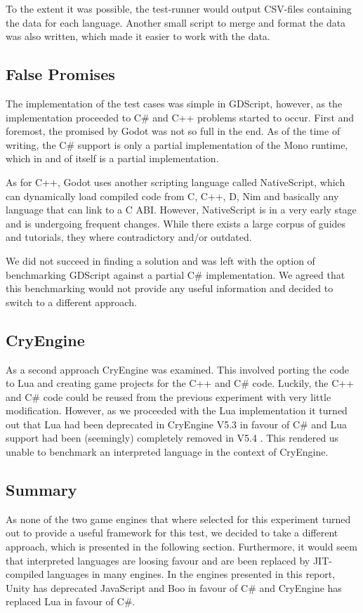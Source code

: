To the extent it was possible, the test-runner would output \ac{CSV}-files containing the data for each language. Another small script to merge and format the data was also written, which made it easier to work with the data.

\subsection{False Promises}
The implementation of the test cases was simple in GDScript, however, as the implementation proceeded to C\# and C++ problems started to occur. First and foremost, the \textit{} promised by Godot was not so full in the end. As of the time of writing, the C\# support is only a partial implementation of the Mono runtime, which in and of itself is a partial implementation.

As for C++, Godot uses another scripting language called NativeScript, which can dynamically load compiled code from C, C++, D, Nim and basically any language that can link to a C \ac{ABI}. However, NativeScript is in a very early stage and is undergoing frequent changes. While there exists a large corpus of guides and tutorials, they where contradictory and/or outdated.

We did not succeed in finding a solution and was left with the option of benchmarking GDScript against a partial C\# implementation. We agreed that this benchmarking would not provide any useful information and decided to switch to a different approach.

\subsection{CryEngine}
As a second approach CryEngine was examined. This involved porting the code to Lua and creating game projects for the C++ and C\# code. Luckily, the C++ and C\# code could be reused from the previous experiment with very little modification. However, as we proceeded with the Lua implementation it turned out that Lua had been deprecated in CryEngine V5.3 in favour of C\# and Lua support had been (seemingly) completely removed in V5.4 \cite{perkins:cryengine}. This rendered us unable to benchmark an interpreted language in the context of CryEngine.

\subsection{Summary}
As none of the two game engines that where selected for this experiment turned out to provide a useful framework for this test, we decided to take a different approach, which is presented in the following section. Furthermore, it would seem that interpreted languages are loosing favour and are been replaced by \ac{JIT}-compiled languages in many engines. In the engines presented in this report, Unity has deprecated JavaScript and Boo in favour of C\# \cite{fine:unityscript, unity:boo} and CryEngine has replaced Lua in favour of C\#\cite{perkins:cryengine}.